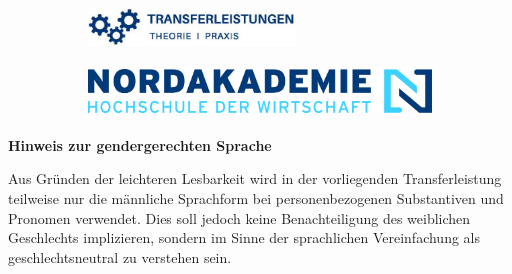 \pagebreak
\thispagestyle{empty}

\setlength{\parindent}{0pt}

\begin{figure}[t]
	\vspace*{-2.9\baselineskip}
	\begin{subfigure}[b]{0.6\textwidth}
		\includegraphics[height=1cm, left]{image/frame/nak-tfl}
	\end{subfigure}
	\begin{subfigure}[b]{0.4\textwidth}
		\includegraphics[height=1.4cm, right]{image/frame/header}
	\end{subfigure}
\end{figure}
\begin{figure}[t]
\end{figure}


\vspace*{\fill}

\large
\textcolor{blue!30!black}{\textbf{Hinweis zur gendergerechten Sprache}}
\newline

\normalsize
Aus Gründen der leichteren Lesbarkeit wird in der vorliegenden Transferleistung teilweise nur die männliche Sprachform bei personenbezogenen Substantiven und Pronomen verwendet. Dies soll jedoch keine Benachteiligung des weiblichen Geschlechts implizieren, sondern im Sinne der sprachlichen Vereinfachung als geschlechtsneutral zu verstehen sein. 

\vspace*{\fill}
